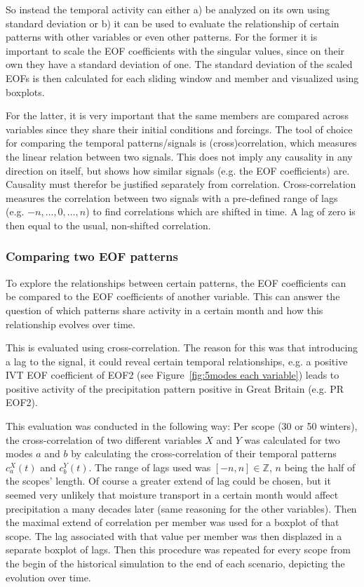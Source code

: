 So instead the temporal activity can either a) be analyzed on its own using standard deviation or b) it can be used to evaluate the relationship of certain patterns with other variables or even other patterns. 
For the former it is important to scale the EOF coefficients with the singular values, since on their own they have a standard deviation of one. 
The standard deviation of the scaled EOFs is then calculated for each sliding window and member and visualized using boxplots. 

For the latter, it is very important that the same members are compared across variables since they share their initial conditions and forcings.  
The tool of choice for comparing the temporal patterns/signals is (cross)correlation, which measures the linear relation between two signals. 
This does not imply any causality in any direction on itself, but shows how similar signals (e.g. the EOF coefficients) are. 
Causality must therefor be justified separately from correlation.  
Cross-correlation measures the correlation between two signals with a pre-defined range of lags (e.g. $-n,\dots,0,\dots,n$) to find correlations which are shifted in time. 
A lag of zero is then equal to the usual, non-shifted correlation. 

\subsubsection{Comparing two EOF patterns}

To explore the relationships between certain patterns, the EOF coefficients can be compared to the EOF coefficients of another variable. 
This can answer the question of which patterns share activity in a certain month and how this relationship evolves over time. 

This is evaluated using cross-correlation. 
The reason for this was that introducing a lag to the signal, it could reveal certain temporal relationships, e.g. a positive IVT EOF coefficient of EOF2 (see Figure~\ref{fig:5modes each variable}) leads to positive activity of the precipitation pattern positive in Great Britain (e.g. PR EOF2). 

This evaluation was conducted in the following way: 
Per scope (30 or 50 winters), the cross-correlation of two different variables $X$ and $Y$ was calculated for two modes $a$ and $b$ by calculating the cross-correlation of their temporal patterns $c_a^X(t)$ and $c_b^Y(t)$. 
The range of lags used was $[-n,n] \in \mathbb{Z}$, $n$ being the half of the scopes' length. 
Of course a greater extend of lag could be chosen, but it seemed very unlikely that moisture transport in a certain month would affect precipitation a many decades later (same reasoning for the other variables).
Then the maximal extend of correlation per member was used for a boxplot of that scope.
The lag associated with that value per member was then displazed in a separate boxplot of lags. 
Then this procedure was repeated for every scope from the begin of the historical simulation to the end of each scenario, depicting the evolution over time. 

